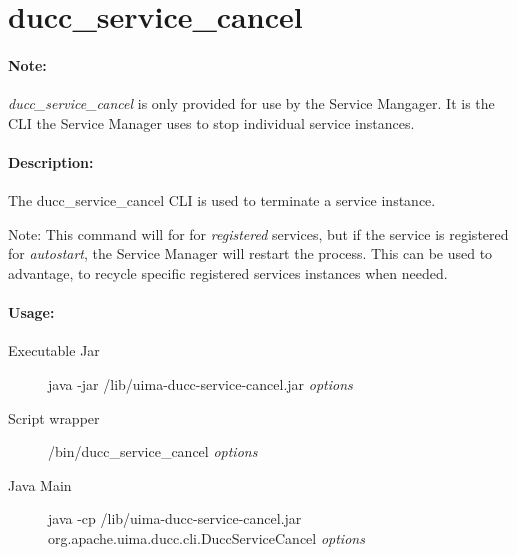 % 
% 
% 
% 
\ifpdf
\else
{}
\fi
    \section{ducc\_service\_cancel}
    \label{sec:cli.service-cancel}
    \paragraph{Note:}  {\em ducc\_service\_cancel} is only provided for use by the
    Service Mangager.  It is the CLI the Service Manager uses to stop individual
    service instances.

    \paragraph{Description:}

    The ducc\_service\_cancel CLI is used to terminate a service instance.

    Note: This command will for for {\em registered} services, but if the service is registered for
    {\em autostart}, the Service Manager will restart the process.  This can be used to advantage, to
    recycle specific registered services instances when needed.

    \paragraph{Usage:}
    \begin{description}
    \item[Executable Jar] java -jar \ducchome/lib/uima-ducc-service-cancel.jar {\em options}
    \item[Script wrapper] \ducchome/bin/ducc\_service\_cancel {\em options}
    \item[Java Main]      java -cp \ducchome/lib/uima-ducc-service-cancel.jar org.apache.uima.ducc.cli.DuccServiceCancel {\em options}
    \end{description}

